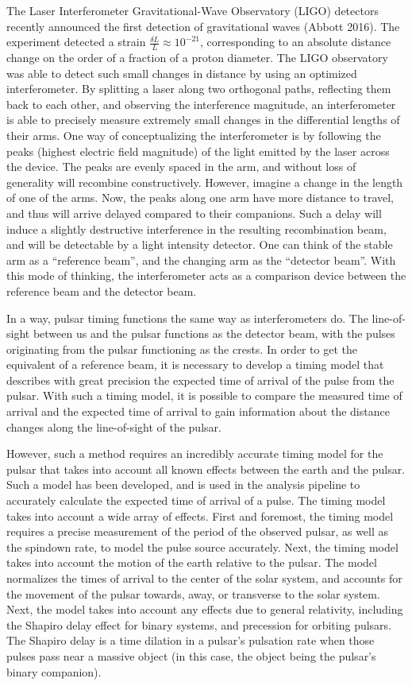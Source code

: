 \documentclass[12pt]{article}
\begin{document}
The Laser Interferometer Gravitational-Wave Observatory (LIGO) detectors recently announced the first detection of gravitational
waves (Abbott 2016). The experiment detected a strain $\frac{\delta L}{L} \approx 10^{-21}$, corresponding to an absolute
distance change on the order of a fraction of a proton diameter. The LIGO
observatory was able to detect such small changes in distance by using an
optimized interferometer. By splitting a laser along two orthogonal paths,
reflecting them back to each other, and observing the interference magnitude, an
interferometer is able to precisely measure extremely small changes in the
differential lengths of their arms. One way of conceptualizing the
interferometer is by following the peaks (highest electric field magnitude) of
the light emitted by the laser across the device. The peaks are evenly spaced
in the arm, and without loss of generality will recombine constructively.
However, imagine a change in the length of one of the arms. Now, the peaks
along one arm have more distance to travel, and thus will arrive delayed
compared to their companions. Such a delay will induce a slightly destructive
interference in the resulting recombination beam, and will be detectable by a
light intensity detector. One can think of the stable arm as a ``reference
beam'', and the changing arm as the ``detector beam''. With this mode of
thinking, the interferometer acts as a comparison device between the reference
beam and the detector beam.

In a way, pulsar timing functions the same way as interferometers do. The
line-of-sight between us and the pulsar functions as the detector beam, with the
pulses originating from the pulsar functioning as the crests. In order to get
the equivalent of a reference beam, it is necessary to develop a timing model
that describes with great precision the expected time of arrival of the pulse
from the pulsar. With such a timing model, it is possible to compare the
measured time of arrival and the expected time of arrival to gain information
about the distance changes along the line-of-sight of the pulsar.

However, such a method requires an incredibly accurate timing model for the
pulsar that takes into account all known effects between the earth and the
pulsar. Such a model has been developed, and is used in the analysis pipeline to
accurately calculate the expected time of arrival of a pulse. The timing model
takes into account a wide array of effects. First and foremost, the timing model
requires a precise measurement of the period of the observed pulsar, as well as
the spindown rate, to model the pulse source accurately. Next, the timing model
takes into account the motion of the earth relative to the pulsar. The model
normalizes the times of arrival to the center of the solar system, and accounts
for the movement of the pulsar towards, away, or transverse to the solar system.
Next, the model takes into account any effects due to general relativity,
including the Shapiro delay effect for binary systems, and precession for
orbiting pulsars. The Shapiro delay is a time dilation in a pulsar's pulsation
rate when those pulses pass near a massive object (in this case, the object
being the pulsar's binary companion).
\end{document}
